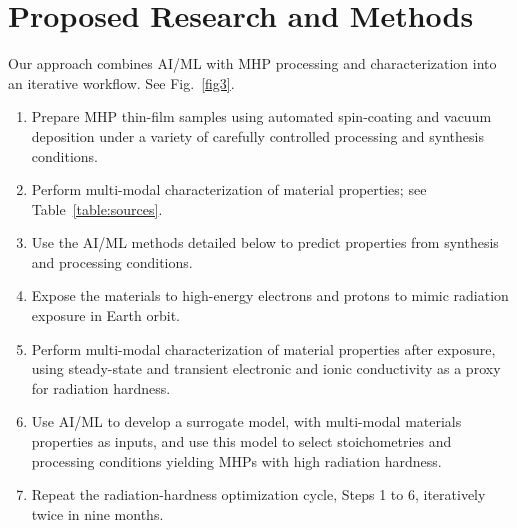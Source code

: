 \documentclass[pgs]{DOE}
\newcommand{\mnote}[1]{{\marginpar{\color{red} #1}}}
\renewcommand{\mnote}[1]{}
\begin{document}
\section{Proposed Research and Methods}
\mnote{1.5 page}
%

Our approach combines AI/ML with MHP processing and characterization into an iterative workflow.
See Fig.~\ref{fig3}.

%
\begin{enumerate}
    \item Prepare MHP thin-film samples using automated spin-coating and vacuum deposition under a variety of carefully controlled processing and synthesis conditions.
    \item Perform multi-modal characterization of material properties; see Table~\ref{table:sources}.
    \item Use the AI/ML methods detailed below to predict properties from synthesis and processing conditions.
    \item Expose the materials to high-energy electrons and protons to mimic radiation exposure in Earth orbit.
    \item Perform multi-modal characterization of material properties after exposure, using steady-state and transient electronic and ionic conductivity as a proxy for radiation hardness.
    \item Use AI/ML to develop a surrogate model, with multi-modal materials properties as inputs, and use this model to select stoichometries and processing conditions yielding MHPs with high radiation hardness.
    \item Repeat the radiation-hardness optimization cycle, Steps 1 to 6, iteratively twice in nine months.
\end{enumerate}
\end{document}

